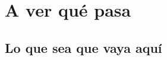 \chapter{A ver qué pasa}

\noindent \lipsum[1-2]

\section{Lo que sea que vaya aquí}

\noindent \lipsum[1-3]